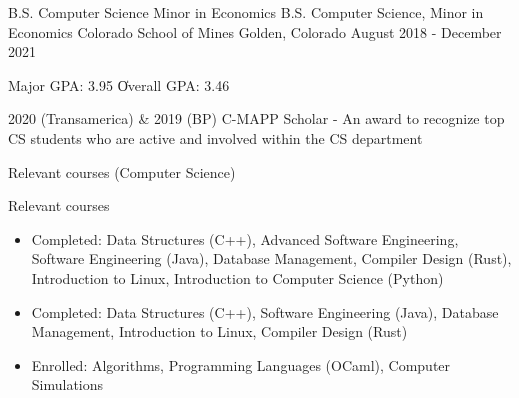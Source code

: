 \vspace{-2.0mm}


\begin{cventries}

  \cventry
    {\ifcv B.S. Computer Science \newline \vspace{-1mm} Minor in Economics \else B.S. Computer Science, Minor in Economics \fi}
    {Colorado School of Mines} %
    {Golden, Colorado} %
    {August 2018 - December 2021} %
    {
      \begin{cvitems} %
        \item {Major GPA: 3.95 \| Overall GPA: 3.46}
    \item {2020 (Transamerica) \& 2019 (BP) C-MAPP Scholar - An award to recognize top CS students who are active and involved within the CS department}
        \ifcv
        \item {Relevant courses (Computer Science)}
        \else
        \item {Relevant courses}
        \fi
        \begin {itemize}
        \ifcv
               \item {Completed: Data Structures (C++), Advanced Software Engineering, Software
    Engineering (Java), Database Management, Compiler Design (Rust), Introduction to Linux, Introduction to Computer Science (Python)}
    \else
    \item {Completed: Data Structures (C++), Software
    Engineering (Java), Database Management, Introduction to Linux, Compiler Design (Rust)}
    \fi
        \item {Enrolled: Algorithms, Programming Languages (OCaml), Computer Simulations}

\end{itemize}
\end{cvitems}}
\end{cventries}
